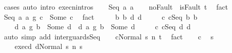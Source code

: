 \begin{isabellebody}
\ {\isacharparenleft}cases{\isacharparenright}\ {\isacharparenleft}auto\ intro{\isacharcolon}\ execn{\isachardot}intros{\isacharparenright}\isanewline
{}\isamarkupfalse%
\isanewline
\ \ \isamarkupfalse%
\ {\isacharparenleft}Seq\ a{}\ a{}{\isacharparenright}\isanewline
\ \ \isamarkupfalse%
\ noFault{\isacharcolon}\ {\isachardoublequoteopen}{\isasymnot}\ isFault\ t{\isachardoublequoteclose}\ \isamarkupfalse%
\ fact\isanewline
\ \ \isamarkupfalse%
\ {\isachardoublequoteopen}{\isacharparenleft}Seq\ a{}\ a{}\ {\isasyminter}\isactrlsub g\ c{}{\isacharparenright}\ {\isacharequal}\ Some\ c{\isachardoublequoteclose}\ \isamarkupfalse%
\ fact\isanewline
\ \ \isamarkupfalse%
\ \isamarkupfalse%
\ b{}\ b{}\ d{}\ d{}\ \isanewline
\ \ \ \ c{}{\isacharcolon}\ {\isachardoublequoteopen}c{}{\isacharequal}Seq\ b{}\ b{}{\isachardoublequoteclose}\ \ \isanewline
\ \ \ \ d{}{\isacharcolon}\ {\isachardoublequoteopen}{\isacharparenleft}a{}\ {\isasyminter}\isactrlsub g\ b{}{\isacharparenright}\ {\isacharequal}\ Some\ d{}{\isachardoublequoteclose}\ \ d{}{\isacharcolon}\ {\isachardoublequoteopen}{\isacharparenleft}a{}\ {\isasyminter}\isactrlsub g\ b{}{\isacharparenright}\ {\isacharequal}\ Some\ d{}{\isachardoublequoteclose}\ \isanewline
\ \ \ \ c{\isacharcolon}\ {\isachardoublequoteopen}c{\isacharequal}Seq\ d{}\ d{}{\isachardoublequoteclose}\isanewline
\ \ \ \ \isamarkupfalse%
\ {\isacharparenleft}auto\ simp\ add{\isacharcolon}\ inter{\isacharunderscore}guards{\isacharunderscore}Seq{\isacharparenright}\isanewline
\ \ \isamarkupfalse%
\ {\isachardoublequoteopen}{\isasymGamma}{\isasymturnstile}{\isasymlangle}c{\isacharcomma}Normal\ s{\isasymrangle}\ {\isacharequal}n{\isasymRightarrow}\ t{\isachardoublequoteclose}\ \isamarkupfalse%
\ fact\isanewline
\ \ \isamarkupfalse%
\ c\ \isamarkupfalse%
\ s{\isacharprime}\ \ \isanewline
\ \ \ \ exec{\isacharunderscore}d{}{\isacharcolon}\ {\isachardoublequoteopen}{\isasymGamma}{\isasymturnstile}{\isasymlangle}d{}{\isacharcomma}Normal\ s{\isasymrangle}\ {\isacharequal}n{\isasymRightarrow}\ s{\isacharprime}{\isachardoublequoteclose}\ \isanewline

\end{isabellebody}
